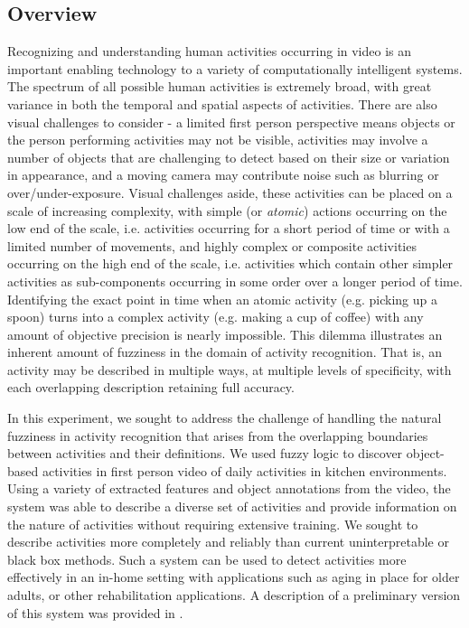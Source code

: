 \documentclass[12pt]{report}
\begin{document}
\subsection{Overview}
Recognizing and understanding human activities occurring in video is an important enabling technology to a variety of computationally intelligent systems. The spectrum of all possible human activities is extremely broad, with great variance in both the temporal and spatial aspects of activities. There are also visual challenges to consider - a limited first person perspective means objects or the person performing activities may not be visible, activities may involve a number of objects that are challenging to detect based on their size or variation in appearance, and a moving camera may contribute noise such as blurring or over/under-exposure. Visual challenges aside, these activities can be placed on a scale of increasing complexity, with simple (or \textit{atomic}) actions occurring on the low end of the scale, i.e. activities occurring for a short period of time or with a limited number of movements, and highly complex or composite activities occurring on the high end of the scale, i.e. activities which contain other simpler activities as sub-components occurring in some order over a longer period of time. Identifying the exact point in time when an atomic activity (e.g. picking up a spoon) turns into a complex activity (e.g. making a cup of coffee) with any amount of objective precision is nearly impossible. This dilemma illustrates an inherent amount of fuzziness in the domain of activity recognition. That is, an activity may be described in multiple ways, at multiple levels of specificity, with each overlapping description retaining full accuracy.

In this experiment, we sought to address the challenge of handling the natural fuzziness in activity recognition that arises from the overlapping boundaries between activities and their definitions. We used fuzzy logic to discover object-based activities in first person video of daily activities in kitchen environments. Using a variety of extracted features and object annotations from the video, the system was able to describe a diverse set of activities and provide information on the nature of activities without requiring extensive training. We sought to describe activities more completely and reliably than current uninterpretable or black box methods. Such a system can be used to detect activities more effectively in an in-home setting with applications such as aging in place for older adults, or other rehabilitation applications. A description of a preliminary version of this system was provided in \cite{Schneider2021BridgingVideo}.
\end{document}
